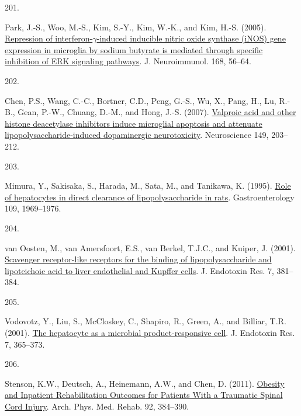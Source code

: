 \documentclass[
]{article}
\newlength{\cslhangindent}
\newlength{\csllabelwidth}
\newlength{\cslentryspacingunit} %
\newenvironment{CSLReferences}[2] %
 {%
  \setlength{\parindent}{0pt}
  \ifodd #1
  \let\oldpar\par
  \def\par{\hangindent=\cslhangindent\oldpar}
  \fi
  \setlength{\parskip}{#2\cslentryspacingunit}
 }%
 {}
\newcommand{\CSLLeftMargin}[1]{\parbox[t]{\csllabelwidth}{#1}}
\newcommand{\CSLRightInline}[1]{\parbox[t]{\linewidth - \csllabelwidth}{#1}\break}
\begin{document}
\begin{CSLReferences}{0}{0}
\leavevmode{}%
\CSLLeftMargin{201. }
\CSLRightInline{Park, J.-S., Woo, M.-S., Kim, S.-Y., Kim, W.-K., and Kim, H.-S. (2005). \href{https://doi.org/10.1016/j.jneuroim.2005.07.003}{Repression of interferon-{\(\gamma\)}-induced inducible nitric oxide synthase ({iNOS}) gene expression in microglia by sodium butyrate is mediated through specific inhibition of {ERK} signaling pathways}. J. Neuroimmunol. 168, 56--64.}

\leavevmode{}%
\CSLLeftMargin{202. }
\CSLRightInline{Chen, P.S., Wang, C.-C., Bortner, C.D., Peng, G.-S., Wu, X., Pang, H., Lu, R.-B., Gean, P.-W., Chuang, D.-M., and Hong, J.-S. (2007). \href{https://doi.org/10.1016/j.neuroscience.2007.06.053}{Valproic acid and other histone deacetylase inhibitors induce microglial apoptosis and attenuate lipopolysaccharide-induced dopaminergic neurotoxicity}. Neuroscience 149, 203--212.}

\leavevmode{}%
\CSLLeftMargin{203. }
\CSLRightInline{Mimura, Y., Sakisaka, S., Harada, M., Sata, M., and Tanikawa, K. (1995). \href{https://doi.org/10.1016/0016-5085(95)90765-3}{Role of hepatocytes in direct clearance of lipopolysaccharide in rats}. Gastroenterology 109, 1969--1976.}

\leavevmode{}%
\CSLLeftMargin{204. }
\CSLRightInline{van Oosten, M., van Amersfoort, E.S., van Berkel, T.J.C., and Kuiper, J. (2001). \href{https://doi.org/10.1177/09680519010070050601}{Scavenger receptor-like receptors for the binding of lipopolysaccharide and lipoteichoic acid to liver endothelial and {Kupffer} cells}. J. Endotoxin Res. 7, 381--384.}

\leavevmode{}%
\CSLLeftMargin{205. }
\CSLRightInline{Vodovotz, Y., Liu, S., McCloskey, C., Shapiro, R., Green, A., and Billiar, T.R. (2001). \href{https://doi.org/10.1177/09680519010070050401}{The hepatocyte as a microbial product-responsive cell}. J. Endotoxin Res. 7, 365--373.}

\leavevmode{}%
\CSLLeftMargin{206. }
\CSLRightInline{Stenson, K.W., Deutsch, A., Heinemann, A.W., and Chen, D. (2011). \href{https://doi.org/10.1016/j.apmr.2010.07.235}{Obesity and {Inpatient Rehabilitation Outcomes} for {Patients With} a {Traumatic Spinal Cord Injury}}. Arch. Phys. Med. Rehab. 92, 384--390.}


\end{CSLReferences}
\end{document}
